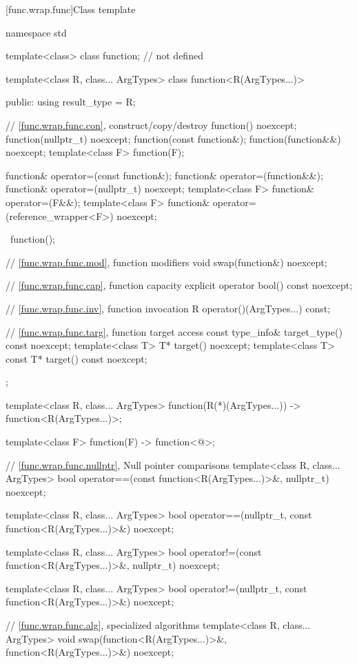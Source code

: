 [func.wrap.func]{Class template }
%

\begin{codeblock}
namespace std {
  template<class> class function; // not defined

  template<class R, class... ArgTypes>
  class function<R(ArgTypes...)> {
  public:
    using result_type = R;

    // \ref{func.wrap.func.con}, construct/copy/destroy
    function() noexcept;
    function(nullptr_t) noexcept;
    function(const function&);
    function(function&&) noexcept;
    template<class F> function(F);

    function& operator=(const function&);
    function& operator=(function&&);
    function& operator=(nullptr_t) noexcept;
    template<class F> function& operator=(F&&);
    template<class F> function& operator=(reference_wrapper<F>) noexcept;

    ~function();

    // \ref{func.wrap.func.mod}, function modifiers
    void swap(function&) noexcept;

    // \ref{func.wrap.func.cap}, function capacity
    explicit operator bool() const noexcept;

    // \ref{func.wrap.func.inv}, function invocation
    R operator()(ArgTypes...) const;

    // \ref{func.wrap.func.targ}, function target access
    const type_info& target_type() const noexcept;
    template<class T>       T* target() noexcept;
    template<class T> const T* target() const noexcept;
  };

  template<class R, class... ArgTypes>
    function(R(*)(ArgTypes...)) -> function<R(ArgTypes...)>;

  template<class F> function(F) -> function<@\seebelow@>;

  // \ref{func.wrap.func.nullptr}, Null pointer comparisons
  template<class R, class... ArgTypes>
    bool operator==(const function<R(ArgTypes...)>&, nullptr_t) noexcept;

  template<class R, class... ArgTypes>
    bool operator==(nullptr_t, const function<R(ArgTypes...)>&) noexcept;

  template<class R, class... ArgTypes>
    bool operator!=(const function<R(ArgTypes...)>&, nullptr_t) noexcept;

  template<class R, class... ArgTypes>
    bool operator!=(nullptr_t, const function<R(ArgTypes...)>&) noexcept;

  // \ref{func.wrap.func.alg}, specialized algorithms
  template<class R, class... ArgTypes>
    void swap(function<R(ArgTypes...)>&, function<R(ArgTypes...)>&) noexcept;
}
\end{codeblock}

